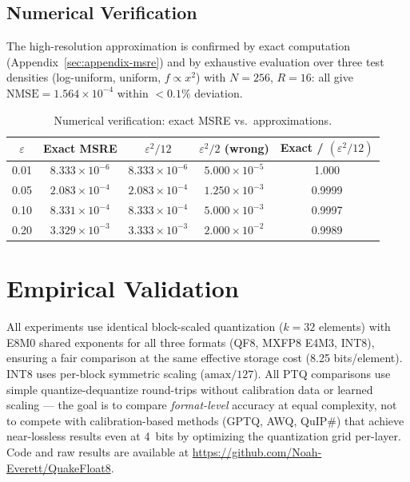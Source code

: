 \documentclass[11pt,letterpaper]{article}
\theoremstyle{definition}
\theoremstyle{remark}
\newcommand{\NMSE}{\mathrm{NMSE}}
\begin{document}
\subsection{Numerical Verification}

The high-resolution approximation is confirmed by exact computation
(Appendix~\ref{sec:appendix-msre}) and by exhaustive evaluation over three test
densities (log-uniform, uniform, $f \propto x^2$) with $N = 256$, $R = 16$:
all give $\NMSE = 1.564 \times 10^{-4}$ within $< 0.1\%$ deviation.

\begin{table}[ht]
\centering
\caption{Numerical verification: exact MSRE vs.\ approximations.}
\label{tab:msre-verify}
\begin{tabular}{@{}ccccc@{}}
\toprule
$\varepsilon$ & Exact MSRE & $\varepsilon^2/12$ & $\varepsilon^2/2$ (wrong) &
  Exact / $(\varepsilon^2/12)$ \\
\midrule
0.01 & $8.333 \times 10^{-6}$  & $8.333 \times 10^{-6}$  &
  $5.000 \times 10^{-5}$  & 1.000 \\
0.05 & $2.083 \times 10^{-4}$  & $2.083 \times 10^{-4}$  &
  $1.250 \times 10^{-3}$  & 0.9999 \\
0.10 & $8.331 \times 10^{-4}$  & $8.333 \times 10^{-4}$  &
  $5.000 \times 10^{-3}$  & 0.9997 \\
0.20 & $3.329 \times 10^{-3}$  & $3.333 \times 10^{-3}$  &
  $2.000 \times 10^{-2}$  & 0.9989 \\
\bottomrule
\end{tabular}
\end{table}


\section{Empirical Validation}
\label{sec:experiments}

All experiments use identical block-scaled quantization ($k = 32$ elements) with
E8M0 shared exponents for all three formats (QF8, MXFP8 E4M3, INT8), ensuring
a fair comparison at the same effective storage cost (8.25 bits/element).
INT8 uses per-block symmetric scaling ($\text{amax}/127$).
All PTQ comparisons use simple quantize-dequantize round-trips without
calibration data or learned scaling --- the goal is to compare \emph{format-level}
accuracy at equal complexity, not to compete with calibration-based methods
(GPTQ, AWQ, QuIP\#) that achieve near-lossless results even at 4~bits by
optimizing the quantization grid per-layer.
Code and raw results are available at
\url{https://github.com/Noah-Everett/QuakeFloat8}.
\end{document}
